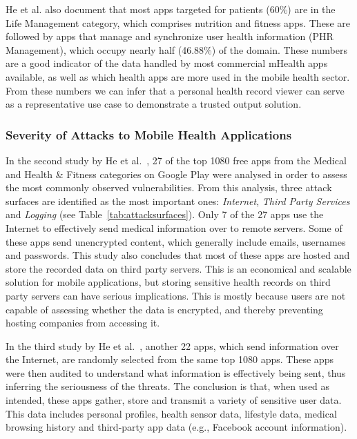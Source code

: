 He et al. also document that most apps targeted for patients (60\%) are in the Life Management category, which comprises nutrition and fitness apps. These are followed by apps that manage and synchronize user health information (\ac{PHR} Management), which occupy nearly half (46.88\%) of the domain. These numbers are a good indicator of the data handled by most commercial mHealth apps available, as well as which health apps are more used in the mobile health sector. From these numbers we can infer that a personal health record viewer can serve as a representative use case to demonstrate a trusted output solution.

\subsubsection{Severity of Attacks to Mobile Health Applications}
In the second study by He et al.~\cite{he2014security}, 27 of the top 1080 free apps from the Medical and Health \& Fitness categories on Google Play were analysed in order to assess the most commonly observed vulnerabilities. From this analysis, three attack surfaces are identified as the most important ones: \emph{Internet}, \emph{Third Party Services} and \emph{Logging} (see Table~\ref{tab:attacksurfaces}). Only 7 of the 27 apps use the Internet to effectively send medical information over to remote servers. Some of these apps send unencrypted content, which generally include emails, usernames and passwords. This study also concludes that most of these apps are hosted and store the recorded data on third party servers. This is an economical and scalable solution for mobile applications, but storing sensitive health records on third party servers can have serious implications. This is mostly because users are not capable of assessing whether the data is encrypted, and thereby preventing hosting companies from accessing it.

In the third study by He et al.~\cite{he2014security}, another 22 apps, which send information over the Internet, are randomly selected from the same top 1080 apps. These apps were then audited to understand what information is effectively being sent, thus inferring the seriousness of the threats. The conclusion is that, when used as intended, these apps gather, store and transmit a variety of sensitive user data. This data includes personal profiles, health sensor data, lifestyle data, medical browsing history and third-party app data (e.g., Facebook account information).

